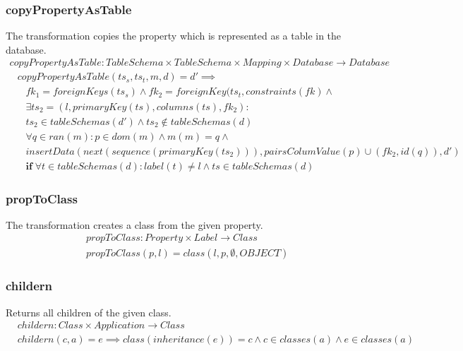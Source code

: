 \documentclass[10pt]{article}
\begin{document}
\subsubsection{copyPropertyAsTable}
The transformation copies the property which is represented as a table in the database.
\begin{align}
copyPropertyAsTable: TableSchema \times TableSchema \times Mapping \times Database \rightarrow Database
\end{align}
\begin{align}
& copyPropertyAsTable(ts_s, ts_t, m, d) = d' \implies \nonumber  \\
& \;\;\; fk_1 = foreignKeys(ts_s) \land fk_2 = foreignKey(ts_t, constraints(fk) \land \nonumber   \\
& \;\;\;  \exists ts_2 = (l, primaryKey(ts), columns(ts), fk_2) :  \nonumber \\
& \;\;\;  ts_2 \in tableSchemas(d') \land ts_2 \notin tableSchemas(d) \nonumber \\
& \;\;\; \forall q \in ran(m) : p \in dom(m) \land m(m) = q \land \nonumber \\  
& \;\;\; insertData(next(sequence(primaryKey(ts_2))), pairsColumValue(p) \cup (fk_2, id(q)) , d')  \nonumber \\
& \;\;\; \mathbf{if} \; \forall t \in tableSchemas(d) : label(t) \neq l \land ts \in tableSchemas(d)
\end{align}

\subsubsection{propToClass}
The transformation creates a class from the given property.
\begin{align}
& propToClass: Property \times Label \rightarrow Class \\
& propToClass(p, l) = class(l, p, \emptyset, OBJECT)
\end{align}

\subsubsection{childern}
Returns all children of the given class.
\begin{align}
& childern : Class \times Application \rightarrow Class \\
& childern(c, a) = e \implies class(inheritance(e)) = c \land c \in classes(a) \land e \in classes(a)
\end{align}
\end{document}
